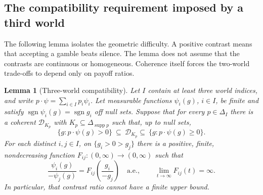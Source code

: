 \documentclass[11pt]{article}
\newtheorem{lemma}[theorem]{Lemma}
\theoremstyle{remark}
\newcommand{\Dscr}{\mathcal D}
\newcommand{\supp}{\operatorname{supp}}
\begin{document}
\subsection*{The compatibility requirement imposed by a third world}

The following lemma isolates the geometric difficulty. A positive contrast
means that accepting a gamble beats silence. The lemma does not assume
that the contrasts are continuous or homogeneous. Coherence itself forces
the two-world trade-offs to depend only on payoff ratios.

\begin{lemma}[Three-world compatibility]\label{lem:three-world}
Let $I$ contain at least three world indices, and write
$p\cdot\psi=\sum_{i\in I}p_i\psi_i$. Let measurable functions
$\psi_i(g)$, $i\in I$, be finite and satisfy
$\operatorname{sgn}\psi_i(g)=\operatorname{sgn}g_i$ off null sets.
Suppose that for every $p\in\Delta_I$ there is a coherent $\Dscr_{K_p}$ with
$K_p\subseteq\Delta_{\supp p}$ such that, up to null sets,
\begin{equation}
 \{g:p\cdot\psi(g)>0\}\ \subseteq\ \Dscr_{K_p}
 \subseteq\ \{g:p\cdot\psi(g)\ge0\}.
 \label{eq:contrast-completion}
\end{equation}
For each distinct $i,j\in I$, on $\{g_i>0>g_j\}$ there is a positive,
finite, nondecreasing function $F_{ij}:(0,\infty)\to(0,\infty)$ such that
\begin{equation}
 \frac{\psi_i(g)}{-\psi_j(g)}
 =F_{ij}\!\left(\frac{g_i}{-g_j}\right)\quad\text{a.e.},
 \qquad \lim_{t\to\infty}F_{ij}(t)=\infty.
 \label{eq:edge-ratio}
\end{equation}
In particular, that contrast ratio cannot have a finite upper bound.
\end{lemma}
\end{document}
